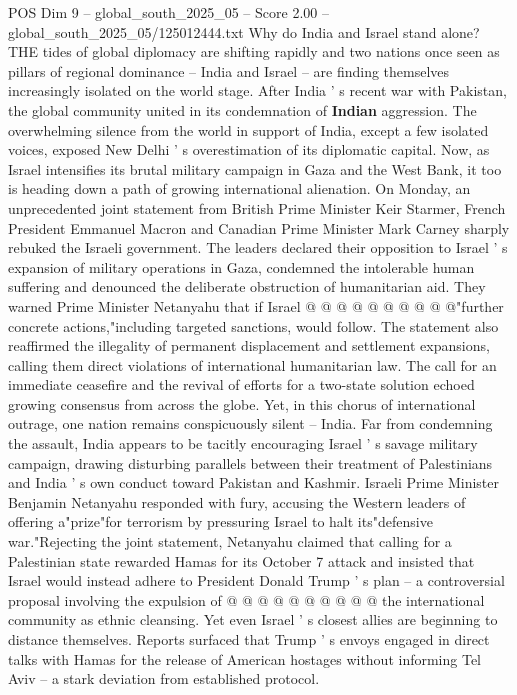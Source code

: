 \begin{textsample}{POS Dim 9 – global\_south\_2025\_05 – Score 2.00 – global\_south\_2025\_05/125012444.txt}  \label{ex:f9_pos_215}
Why do India and Israel stand alone?
THE tides of global diplomacy are shifting rapidly and two nations once seen as pillars of regional dominance -- India and Israel -- are finding themselves increasingly isolated on the world stage.
After India ' s recent war with Pakistan, the global community united in its condemnation of \textbf{Indian} aggression.
The overwhelming silence from the world in support of India, except a few isolated voices, exposed New Delhi ' s overestimation of its diplomatic capital.
Now, as Israel intensifies its brutal military campaign in Gaza and the West Bank, it too is heading down a path of growing international alienation.
On Monday, an unprecedented joint statement from British Prime Minister Keir Starmer, French President Emmanuel Macron and Canadian Prime Minister Mark Carney sharply rebuked the Israeli government.
The leaders declared their opposition to Israel ' s expansion of military operations in Gaza, condemned the intolerable human suffering and denounced the deliberate obstruction of humanitarian aid.
They warned Prime Minister Netanyahu that if Israel @ @ @ @ @ @ @ @ @ @"further concrete actions,"including targeted sanctions, would follow.
The statement also reaffirmed the illegality of permanent displacement and settlement expansions, calling them direct violations of international humanitarian law.
The call for an immediate ceasefire and the revival of efforts for a two-state solution echoed growing consensus from across the globe.
Yet, in this chorus of international outrage, one nation remains conspicuously silent -- India.
Far from condemning the assault, India appears to be tacitly encouraging Israel ' s savage military campaign, drawing disturbing parallels between their treatment of Palestinians and India ' s own conduct toward Pakistan and Kashmir.
Israeli Prime Minister Benjamin Netanyahu responded with fury, accusing the Western leaders of offering a"prize"for terrorism by pressuring Israel to halt its"defensive war."Rejecting the joint statement, Netanyahu claimed that calling for a Palestinian state rewarded Hamas for its October 7 attack and insisted that Israel would instead adhere to President Donald Trump ' s plan -- a controversial proposal involving the expulsion of @ @ @ @ @ @ @ @ @ @ the international community as ethnic cleansing.
Yet even Israel ' s closest allies are beginning to distance themselves.
Reports surfaced that Trump ' s envoys engaged in direct talks with Hamas for the release of American hostages without informing Tel Aviv -- a stark deviation from established protocol.

\end{textsample}
